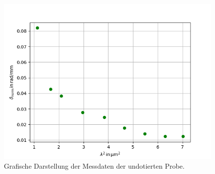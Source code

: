\begin{figure}
  \centering
  \includegraphics[scale=0.7]{fig/undotiert.png}
  \caption{Grafische Darstellung der Messdaten der undotierten Probe.}
  \label{abb:undot}
\end{figure}
\FloatBarrier

